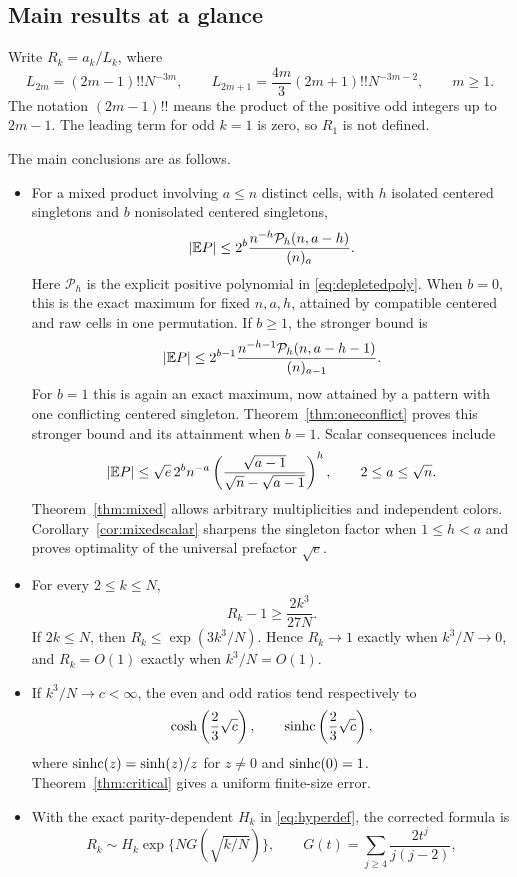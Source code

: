 \subsection{Main results at a glance}

Write $R_k=a_k/L_k$, where
\begin{equation}\label{eq:leading}
L_{2m}=(2m-1)!!N^{-3m},\qquad
L_{2m+1}=\frac{4m}{3}(2m+1)!!N^{-3m-2},\qquad m\ge1.
\end{equation}
The notation $(2m-1)!!$ means the product of the positive odd integers up to $2m-1$. The leading term for odd $k=1$ is zero, so $R_1$ is not defined.

The main conclusions are as follows.
\begin{itemize}
\item For a mixed product involving $a\le n$ distinct cells, with $h$ isolated centered singletons and $b$ nonisolated centered singletons,
\[
|\mathbb E P|\le2^b\frac{n^{-h}\mathcal P_h(n,a-h)}{(n)_a}.
\]
Here $\mathcal P_h$ is the explicit positive polynomial in \eqref{eq:depletedpoly}. When $b=0$, this is the exact maximum for fixed $n,a,h$, attained by compatible centered and raw cells in one permutation. If $b\ge1$, the stronger bound is
\[
|\mathbb E P|\le2^{b-1}\frac{n^{-h-1}\mathcal P_h(n,a-h-1)}{(n)_{a-1}}.
\]
For $b=1$ this is again an exact maximum, now attained by a pattern with one conflicting centered singleton. Theorem~\ref{thm:oneconflict} proves this stronger bound and its attainment when $b=1$. Scalar consequences include
\[
|\mathbb E P|\le\sqrt e\,2^b n^{-a}
\left(\frac{\sqrt{a-1}}{\sqrt n-\sqrt{a-1}}\right)^h,
\qquad 2\le a\le\sqrt n.
\]
Theorem~\ref{thm:mixed} allows arbitrary multiplicities and independent colors. Corollary~\ref{cor:mixedscalar} sharpens the singleton factor when $1\le h<a$ and proves optimality of the universal prefactor $\sqrt e$.
\item For every $2\le k\le N$,
\[
R_k-1\ge\frac{2k^3}{27N}.
\]
If $2k\le N$, then $R_k\le\exp(3k^3/N)$. Hence $R_k\to1$ exactly when $k^3/N\to0$, and $R_k=O(1)$ exactly when $k^3/N=O(1)$.
\item If $k^3/N\to c<\infty$, the even and odd ratios tend respectively to
\[
\cosh\left(\frac23\sqrt c\right),\qquad
\operatorname{sinhc}\left(\frac23\sqrt c\right),
\]
where $\operatorname{sinhc}(z)=\sinh(z)/z$ for $z\ne0$ and $\operatorname{sinhc}(0)=1$. Theorem~\ref{thm:critical} gives a uniform finite-size error.
\item With the exact parity-dependent $H_k$ in \eqref{eq:hyperdef}, the corrected formula is
\[
R_k\sim H_k\exp\{NG(\sqrt{k/N})\},\qquad
G(t)=\sum_{j\ge4}\frac{2t^j}{j(j-2)},
\]
\end{itemize}

